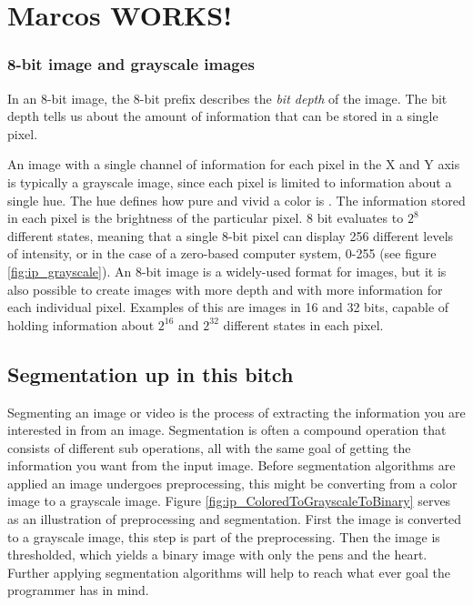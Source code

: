 \chapter{Marcos WORKS!}

\subsection{8-bit image and grayscale images}
In an 8-bit image, the 8-bit prefix describes the \textit{bit depth} of the image. The bit depth tells us about the amount of information that can be stored in a single pixel.

An image with a single channel of information for each pixel in the X and Y axis is typically a grayscale image, since each pixel is limited to information about a single hue. The hue defines how pure and vivid a color is \citep{visual_story}. The information stored in each pixel is the brightness of the particular pixel. 8 bit evaluates to $2^8$ different states, meaning that a single 8-bit pixel can display 256 different levels of intensity, or in the case of a zero-based computer system, 0-255 (see figure \ref{fig:ip_grayscale}). An 8-bit image is a widely-used format for images, but it is also possible to create images with more depth and with more information for each individual pixel. Examples of this are images in 16 and 32 bits, capable of holding information about $2^{16}$ and $2^{32}$ different states in each pixel.

\section{Segmentation up in this bitch}

Segmenting an image or video is the process of extracting the information you are interested in from an image. Segmentation is often a compound operation that consists of different sub operations, all with the same goal of getting the information you want from the input image. Before segmentation algorithms are applied an image undergoes preprocessing, this might be converting from a color image to a grayscale image. Figure \ref{fig:ip_ColoredToGrayscaleToBinary} serves as an illustration of preprocessing and segmentation. First the image is converted to a grayscale image, this step is part of the preprocessing. Then the image is thresholded, which yields a binary image with only the pens and the heart. Further applying segmentation algorithms will help to reach what ever goal the programmer has in mind.
